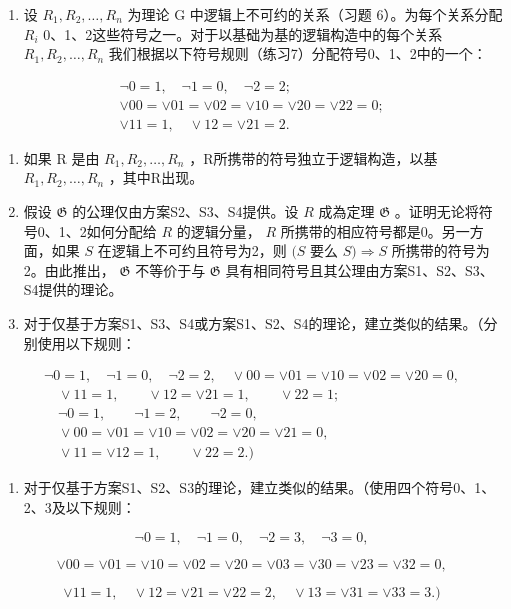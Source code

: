 \begin{enumerate}
\def\labelenumi{\arabic{enumi}.}
\setcounter{enumi}{7}
\tightlist
\item
  设 \(R_{1}, R_{2}, \ldots, R_{n}\) 为理论 G 中逻辑上不可约的关系（习题 6）。为每个关系分配 \(R_{i}\) 0、1、2这些符号之一。对于以基础为基的逻辑构造中的每个关系 \(R_{1}, R_{2}, \ldots, R_{n}\) 我们根据以下符号规则（练习7）分配符号0、1、2中的一个：
\end{enumerate}

\[
\begin{array}{c} \neg 0 = 1, \quad \neg 1 = 0, \quad \neg 2 = 2; \\ \lor 0 0 = \lor 0 1 = \lor 0 2 = \lor 1 0 = \lor 2 0 = \lor 2 2 = 0; \\ \lor 1 1 = 1, \quad \lor 1 2 = \lor 2 1 = 2. \end{array}
\]

\begin{enumerate}
\def\labelenumi{(\alph{enumi})}
\item
  如果 R 是由 \(R_{1}, R_{2}, \ldots, R_{n}\) ，R所携带的符号独立于逻辑构造，以基 \(R_{1}, R_{2}, \ldots, R_{n}\) ，其中R出现。
\item
  假设 \(\mathfrak{G}\) 的公理仅由方案S2、S3、S4提供。设 \(R\) 成為定理 \(\mathfrak{G}\) 。证明无论将符号0、1、2如何分配给 \(R\) 的逻辑分量， \(R\) 所携带的相应符号都是0。另一方面，如果 \(S\) 在逻辑上不可约且符号为2，则 \((S\) 要么 \(S) \Longrightarrow S\) 所携带的符号为2。由此推出， \(\mathfrak{G}\) 不等价于与 \(\mathfrak{G}\) 具有相同符号且其公理由方案S1、S2、S3、S4提供的理论。
\item
  对于仅基于方案S1、S3、S4或方案S1、S2、S4的理论，建立类似的结果。（分别使用以下规则：
\end{enumerate}

\[
\begin{array}{c} \neg 0 = 1, \quad \neg 1 = 0, \quad \neg 2 = 2, \quad \lor 0 0 = \lor 0 1 = \lor 1 0 = \lor 0 2 = \lor 2 0 = 0, \\ \quad \lor 1 1 = 1, \qquad \lor 1 2 = \lor 2 1 = 1, \qquad \lor 2 2 = 1; \\ \quad \neg 0 = 1, \qquad \neg 1 = 2, \qquad \neg 2 = 0, \\ \quad \lor 0 0 = \lor 0 1 = \lor 1 0 = \lor 0 2 = \lor 2 0 = \lor 2 1 = 0, \\ \quad \lor 1 1 = \lor 1 2 = 1, \qquad \lor 2 2 = 2.) \end{array}
\]

\begin{enumerate}
\def\labelenumi{(\alph{enumi})}
\setcounter{enumi}{3}
\tightlist
\item
  对于仅基于方案S1、S2、S3的理论，建立类似的结果。（使用四个符号0、1、2、3及以下规则：
\end{enumerate}

\[
\lnot 0 = 1, \quad \lnot 1 = 0, \quad \lnot 2 = 3, \quad \lnot 3 = 0,
\]

\[
\vee 0 0 = \vee 0 1 = \vee 1 0 = \vee 0 2 = \vee 2 0 = \vee 0 3 = \vee 3 0 = \vee 2 3 = \vee 3 2 = 0,
\]

\[
\vee 1 1 = 1, \quad \vee 1 2 = \vee 2 1 = \vee 2 2 = 2, \quad \vee 1 3 = \vee 3 1 = \vee 3 3 = 3.)
\]
